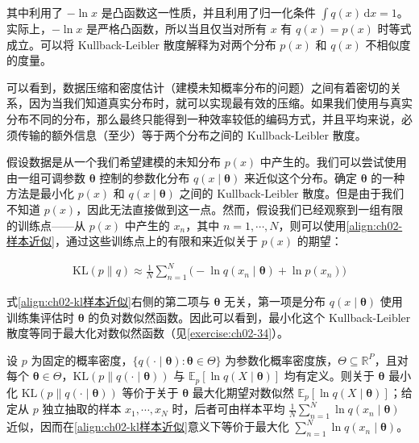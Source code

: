 \documentclass[../../main.tex]{subfiles}
\begin{document}
其中利用了 $-\ln x$ 是凸函数这一性质，并且利用了归一化条件 $\int q(x)\,\mathrm{d}x=1$。实际上，$-\ln x$ 是严格凸函数，所以当且仅当对所有 $x$ 有 $q(x)=p(x)$ 时等式成立。可以将 Kullback-Leibler 散度解释为对两个分布 $p(x)$ 和 $q(x)$ 不相似度的度量。

可以看到，数据压缩和密度估计（建模未知概率分布的问题）之间有着密切的关系，因为当我们知道真实分布时，就可以实现最有效的压缩。如果我们使用与真实分布不同的分布，那么最终只能得到一种效率较低的编码方式，并且平均来说，必须传输的额外信息（至少）等于两个分布之间的 Kullback-Leibler 散度。

假设数据是从一个我们希望建模的未知分布 $p(x)$ 中产生的。我们可以尝试使用由一组可调参数 $\boldsymbol{\theta}$ 控制的参数化分布 $q(x\mid\boldsymbol{\theta})$ 来近似这个分布。确定 $\boldsymbol{\theta}$ 的一种方法是最小化 $p(x)$ 和 $q(x\mid\boldsymbol{\theta})$ 之间的 Kullback-Leibler 散度。但是由于我们不知道 $p(x)$，因此无法直接做到这一点。然而，假设我们已经观察到一组有限的训练点——从 $p(x)$ 中产生的 $x_n$，其中 $n=1,\cdots,N$，则可以使用\eqref{align:ch02-样本近似}，通过这些训练点上的有限和来近似关于 $p(x)$ 的期望：

\begin{align}
  \mathrm{KL}(p\|q) \approx \frac{1}{N}\sum_{n=1}^{N}\big(-\ln q(x_n\mid\boldsymbol{\theta}) + \ln p(x_n)\big)
  \label{align:ch02-kl样本近似}
\end{align}

式\eqref{align:ch02-kl样本近似}右侧的第二项与 $\boldsymbol{\theta}$ 无关，第一项是分布 $q(x\mid\boldsymbol{\theta})$ 使用训练集评估时 $\boldsymbol{\theta}$ 的负对数似然函数。因此可以看到，最小化这个 Kullback-Leibler 散度等同于最大化对数似然函数（见\cref{exercise:ch02-34}）。

\begin{proposition}[KL 散度与对数似然]\label{proposition:ch02-kl与似然}
设 $p$ 为固定的概率密度，$\{q(\cdot\mid\boldsymbol{\theta}):\boldsymbol{\theta}\in\Theta\}$ 为参数化概率密度族，$\Theta\subseteq\mathbb{R}^{P}$，且对每个 $\boldsymbol{\theta}\in\Theta$，$\mathrm{KL}(p\|q(\cdot\mid\boldsymbol{\theta}))$ 与 $\mathbb{E}_p[\ln q(X\mid\boldsymbol{\theta})]$ 均有定义。则关于 $\boldsymbol{\theta}$ 最小化 $\mathrm{KL}(p\|q(\cdot\mid\boldsymbol{\theta}))$ 等价于关于 $\boldsymbol{\theta}$ 最大化期望对数似然 $\mathbb{E}_p[\ln q(X\mid\boldsymbol{\theta})]$；给定从 $p$ 独立抽取的样本 $x_1,\cdots,x_N$ 时，后者可由样本平均 $\frac{1}{N}\sum_{n=1}^{N}\ln q(x_n\mid\boldsymbol{\theta})$ 近似，因而在\eqref{align:ch02-kl样本近似}意义下等价于最大化 $\sum_{n=1}^{N}\ln q(x_n\mid\boldsymbol{\theta})$。
\end{proposition}
\end{document}
